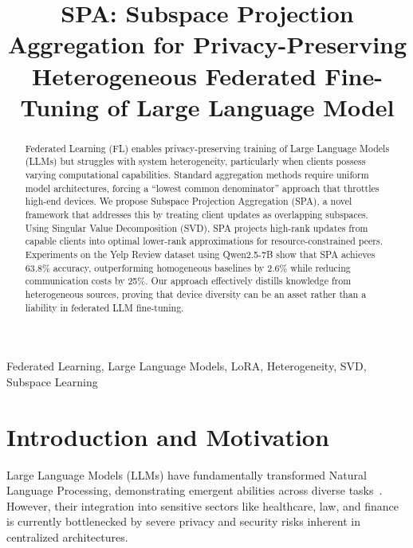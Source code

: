 \documentclass[conference]{IEEEtran}
\begin{document}
\title{SPA: Subspace Projection Aggregation for Privacy-Preserving Heterogeneous Federated Fine-Tuning of Large Language Model}

\author{
}

\maketitle

\begin{abstract}
Federated Learning (FL) enables privacy-preserving training of Large Language Models (LLMs) but struggles with system heterogeneity, particularly when clients possess varying computational capabilities. Standard aggregation methods require uniform model architectures, forcing a ``lowest common denominator'' approach that throttles high-end devices. We propose Subspace Projection Aggregation (SPA), a novel framework that addresses this by treating client updates as overlapping subspaces. Using Singular Value Decomposition (SVD), SPA projects high-rank updates from capable clients into optimal lower-rank approximations for resource-constrained peers. Experiments on the Yelp Review dataset using Qwen2.5-7B show that SPA achieves 63.8\% accuracy, outperforming homogeneous baselines by 2.6\% while reducing communication costs by 25\%. Our approach effectively distills knowledge from heterogeneous sources, proving that device diversity can be an asset rather than a liability in federated LLM fine-tuning.
\end{abstract}

\begin{IEEEkeywords}
Federated Learning, Large Language Models, LoRA, Heterogeneity, SVD, Subspace Learning
\end{IEEEkeywords}
\section{Introduction and Motivation}
\label{sec:intro}

Large Language Models (LLMs) have fundamentally transformed Natural Language Processing, demonstrating emergent abilities across diverse tasks~\cite{brown2020language, touvron2023llama, achiam2023gpt}. However, their integration into sensitive sectors like healthcare, law, and finance is currently bottlenecked by severe privacy and security risks inherent in centralized architectures.
\end{document}
